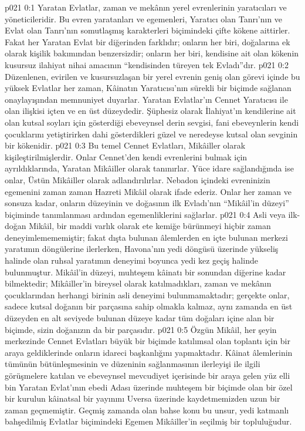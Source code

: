 \vs p021 0:1 Yaratan Evlatlar, zaman ve mekânın yerel evrenlerinin yaratıcıları ve yöneticileridir. Bu evren yaratanları ve egemenleri, Yaratıcı olan Tanrı’nın ve Evlat olan Tanrı’nın somutlaşmış karakterleri biçimindeki çifte kökene aittirler. Fakat her Yaratan Evlat bir diğerinden farklıdır; onların her biri, doğalarına ek olarak kişilik bakımından benzersizdir; onların her biri, kendisine ait olan kökenin kusursuz ilahiyat nihai amacının “kendisinden türeyen tek Evladı”dır.
\vs p021 0:2 Düzenlenen, evirilen ve kusursuzlaşan bir yerel evrenin geniş olan görevi içinde bu yüksek Evlatlar her zaman, Kâinatın Yaratıcısı’nın sürekli bir biçimde sağlanan onaylayışından memnuniyet duyarlar. Yaratan Evlatlar’ın Cennet Yaratıcısı ile olan ilişkisi içten ve en üst düzeydedir. Şüphesiz olarak İlahiyat’ın kendilerine ait olan kutsal soyları için gösterdiği ebeveynsel derin sevgisi, fani ebeveynlerin kendi çocuklarını yetiştirirken dahi gösterdikleri güzel ve neredeyse kutsal olan sevginin bir kökenidir.
\vs p021 0:3 Bu temel Cennet Evlatları, Mikâiller olarak kişileştirilmişlerdir. Onlar Cennet’den kendi evrenlerini bulmak için ayrıldıklarında, Yaratan Mikâiller olarak tanınırlar. Yüce idare sağlandığında ise onlar, Üstün Mikâiller olarak adlandırılırlar. Nebadon içindeki evreninizin egemenini zaman zaman Hazreti Mikâil olarak ifade ederiz. Onlar her zaman ve sonsuza kadar, onların düzeyinin ve doğasının ilk Evladı’nın “Mikâil’in düzeyi” biçiminde tanımlanması ardından egemenliklerini sağlarlar.
\vs p021 0:4 Asli veya ilk\hyp{}doğan Mikâil, bir maddi varlık olarak ete kemiğe bürünmeyi hiçbir zaman deneyimlemememiştir; fakat dışta bulunan âlemlerden en içte bulunan merkezi yaratımın döngülerine ilerlerken, Havona’nın yedi döngüsü üzerinde yükseliş halinde olan ruhsal yaratımın deneyimi boyunca yedi kez geçiş halinde bulunmuştur. Mikâil’in düzeyi, muhteşem kâinatı bir sonundan diğerine kadar bilmektedir; Mikâiller’in bireysel olarak katılmadıkları, zaman ve mekânın çocuklarından herhangi birinin asli deneyimi bulunmamaktadır; gerçekte onlar, sadece kutsal doğanın bir parçasına sahip olmakla kalmaz, aynı zamanda en üst düzeyden en alt seviyede bulunan düzeye kadar tüm doğaları içine alan bir biçimde, sizin doğanızın da bir parçasıdır.
\vs p021 0:5 Özgün Mikâil, her şeyin merkezinde Cennet Evlatları büyük bir biçimde katılımsal olan toplantı için bir araya geldiklerinde onların idareci başkanlığını yapmaktadır. Kâinat âlemlerinin tümünün bütünleşmesinin ve düzeninin sağlanmasının ilerleyişi ile ilgili görüşmelere katılan ve ebeveynsel mevcudiyet içerisinde bir araya gelen yüz elli bin Yaratan Evlat’ının ebedi Adası üzerinde muhteşem bir biçimde olan bir özel bir kurulun kâinatsal bir yayınını Uversa üzerinde kaydetmemizden uzun bir zaman geçmemiştir. Geçmiş zamanda olan bahse konu bu unsur, yedi katmanlı bahşedilmiş Evlatlar biçimindeki Egemen Mikâiller’in seçilmiş bir topluluğudur.
